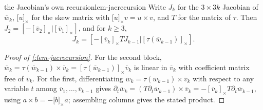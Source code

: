 \documentclass[a4paper,11pt]{scrartcl}
\begin{document}
\begin{lemma}{the Jacobian's own recursion}{lem-jacrecursion} Write \(J_{k}\) for the \(3 \times 3k\) Jacobian of \({\overline{w}}_{k}\), \(\lbrack u\rbrack_{\times}\) for the skew matrix with \(\lbrack u\rbrack_{\times}v = u \times v\), and \(T\) for the matrix of \(\tau\). Then \(J_{2} = \left\lbrack - \left\lbrack {\overline{v}}_{2} \right\rbrack_{\times}|\left\lbrack {\overline{v}}_{1} \right\rbrack_{\times} \right\rbrack\), and for \(k \geq 3\), \[J_{k} = \left\lbrack - \left\lbrack {\overline{v}}_{k} \right\rbrack_{\times}TJ_{k - 1}|\left\lbrack \tau({\overline{w}}_{k - 1}) \right\rbrack_{\times} \right\rbrack.\]

\end{lemma} \protect{}\label{lem-jacrecursion}{}

\begin{proof}[Proof of \cref{:lem-jacrecursion}] For the second block, \({\overline{w}}_{k} = \tau({\overline{w}}_{k - 1}) \times {\overline{v}}_{k} = \left\lbrack \tau({\overline{w}}_{k - 1}) \right\rbrack_{\times}{\overline{v}}_{k}\) is linear in \({\overline{v}}_{k}\) with coefficient matrix free of \({\overline{v}}_{k}\). For the first, differentiating \({\overline{w}}_{k} = \tau({\overline{w}}_{k - 1}) \times {\overline{v}}_{k}\) with respect to any variable \(t\) among \({\overline{v}}_{1},\ldots,{\overline{v}}_{k - 1}\) gives \(\partial_{t}{\overline{w}}_{k} = \left( T\partial_{t}{\overline{w}}_{k - 1} \right) \times {\overline{v}}_{k} = - \left\lbrack {\overline{v}}_{k} \right\rbrack_{\times}T\partial_{t}{\overline{w}}_{k - 1}\), using \(a \times b = - \lbrack b\rbrack_{\times}a\); assembling columns gives the stated product.

\end{proof}
\end{document}
